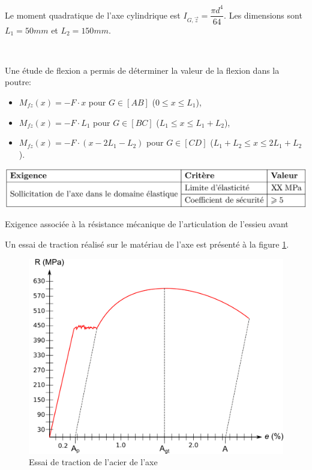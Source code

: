 Le moment quadratique de l'axe cylindrique est $I_{G,\vec{z}}=\dfrac{\pi d^4}{64}$. Les dimensions sont $L_1 = 50 mm$ et $L_2 = 150 mm$.


~\

Une étude de flexion a permis de déterminer la valeur de la flexion dans la poutre:
\begin{itemize}
 \item $M_{fz}(x)=-F\cdot x$ pour $G\in[AB]$ ($0\leq x\leq L_1$), 
 \item $M_{fz}(x)=-F\cdot L_1$ pour $G\in[BC]$ ($L_1\leq x\leq L_1+L_2$),
 \item $M_{fz}(x)=-F\cdot (x-2L_1-L_2)$ pour $G\in[CD]$ ($L_1+L_2\leq x\leq 2L_1+L_2$).
\end{itemize}

\begin{table}[!ht]
\begin{center}
 \includegraphics[width=0.8\linewidth]{img/tab03.png}
 \end{center}
  \caption{Exigence associée à la résistance mécanique de l'articulation de l'essieu avant}
\label{tab03}
\end{table}

Un essai de traction réalisé sur le matériau de l'axe est présenté à la figure \ref{fig10}.

\begin{figure}[!ht]
\begin{center}
 \includegraphics[width=0.5\linewidth]{img/fig10.png}
 \end{center}
  \caption{Essai de traction de l'acier de l'axe}
\label{fig10}
\end{figure}


